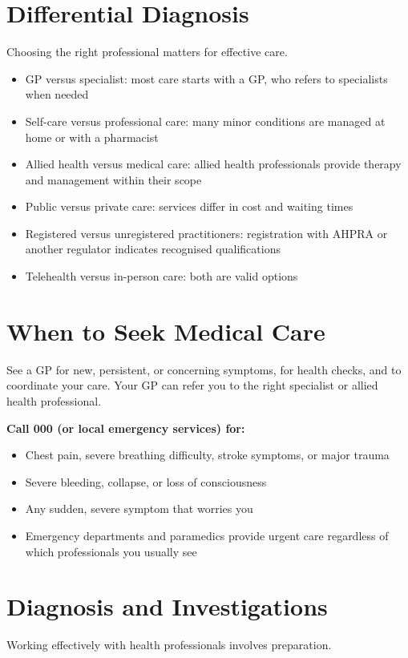 \section*{Differential Diagnosis}
Choosing the right professional matters for effective care.

\begin{itemize}
    \item GP versus specialist: most care starts with a GP, who refers to specialists when needed
    \item Self-care versus professional care: many minor conditions are managed at home or with a pharmacist
    \item Allied health versus medical care: allied health professionals provide therapy and management within their scope
    \item Public versus private care: services differ in cost and waiting times
    \item Registered versus unregistered practitioners: registration with AHPRA or another regulator indicates recognised qualifications
    \item Telehealth versus in-person care: both are valid options
\end{itemize}

\section*{When to Seek Medical Care}
See a GP for new, persistent, or concerning symptoms, for health checks, and to coordinate your care. Your GP can refer you to the right specialist or allied health professional.

\textbf{Call 000 (or local emergency services) for:}
\begin{itemize}
    \item Chest pain, severe breathing difficulty, stroke symptoms, or major trauma
    \item Severe bleeding, collapse, or loss of consciousness
    \item Any sudden, severe symptom that worries you
    \item Emergency departments and paramedics provide urgent care regardless of which professionals you usually see
\end{itemize}

\section*{Diagnosis and Investigations}
Working effectively with health professionals involves preparation.

